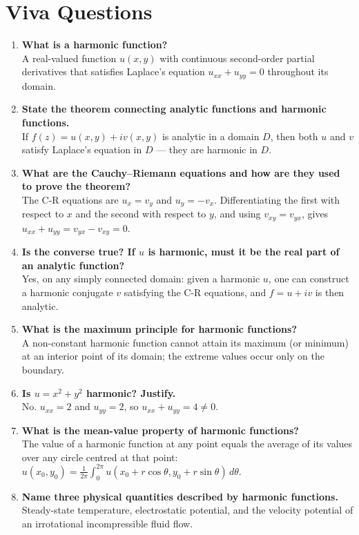 \documentclass[12pt,a4paper]{article}
\begin{document}
\section{Viva Questions}

\begin{enumerate}
  \item \textbf{What is a harmonic function?} \\
  A real-valued function $u(x,y)$ with continuous second-order partial derivatives that satisfies
  Laplace's equation $u_{xx}+u_{yy}=0$ throughout its domain.

  \item \textbf{State the theorem connecting analytic functions and harmonic functions.} \\
  If $f(z)=u(x,y)+iv(x,y)$ is analytic in a domain $D$, then both $u$ and $v$ satisfy
  Laplace's equation in $D$ --- they are harmonic in $D$.

  \item \textbf{What are the Cauchy--Riemann equations and how are they used to prove the theorem?} \\
  The C-R equations are $u_{x}=v_{y}$ and $u_{y}=-v_{x}$. Differentiating the first with respect
  to $x$ and the second with respect to $y$, and using $v_{xy}=v_{yx}$, gives
  $u_{xx}+u_{yy}=v_{yx}-v_{xy}=0$.

  \item \textbf{Is the converse true? If $u$ is harmonic, must it be the real part of an analytic function?} \\
  Yes, on any simply connected domain: given a harmonic $u$, one can construct a harmonic
  conjugate $v$ satisfying the C-R equations, and $f=u+iv$ is then analytic.

  \item \textbf{What is the maximum principle for harmonic functions?} \\
  A non-constant harmonic function cannot attain its maximum (or minimum) at an interior point
  of its domain; the extreme values occur only on the boundary.

  \item \textbf{Is $u=x^{2}+y^{2}$ harmonic? Justify.} \\
  No. $u_{xx}=2$ and $u_{yy}=2$, so $u_{xx}+u_{yy}=4\neq 0$.

  \item \textbf{What is the mean-value property of harmonic functions?} \\
  The value of a harmonic function at any point equals the average of its values over any circle
  centred at that point: $u(x_{0},y_{0})=\frac{1}{2\pi}\int_{0}^{2\pi}
  u(x_{0}+r\cos\theta,y_{0}+r\sin\theta)\,d\theta$.

  \item \textbf{Name three physical quantities described by harmonic functions.} \\
  Steady-state temperature, electrostatic potential, and the velocity potential of an irrotational
  incompressible fluid flow.
\end{enumerate}
\end{document}
